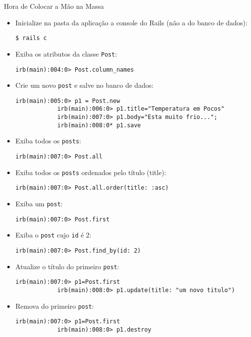 \begin{frame}{Hora de Colocar a Mão na Massa}
	\begin{itemize}
		\item Inicialize \alert{na pasta da aplicação} a console do Rails (não a do banco de dados):
		\begin{lstlisting}[style=BashInputBasicStyle]
			$ rails c
		\end{lstlisting}
		
		\item Exiba os atributos da classe \verb|Post|:
		\begin{lstlisting}[style=BashInputBasicStyle]
			irb(main):004:0> Post.column_names
		\end{lstlisting}
		
		\item Crie um novo \verb|post| e salve no banco de dados:
		\begin{lstlisting}[style=BashInputBasicStyle]
			irb(main):005:0> p1 = Post.new
			irb(main):006:0> p1.title="Temperatura em Pocos"
			irb(main):007:0> p1.body="Esta muito frio...";
			irb(main):008:0* p1.save
		\end{lstlisting}
		
		\item Exiba todos os \verb|posts|:
		\begin{lstlisting}[style=BashInputBasicStyle]
			irb(main):007:0> Post.all
		\end{lstlisting}
		
		\item Exiba todos os \verb|posts| ordenados pelo título (title):
		\begin{lstlisting}[style=BashInputBasicStyle]
			irb(main):007:0> Post.all.order(title: :asc)
		\end{lstlisting}
		
		\item Exiba um \verb|post|:
		\begin{lstlisting}[style=BashInputBasicStyle]
			irb(main):007:0> Post.first
		\end{lstlisting}
		
		\item Exiba o \verb|post| cujo \verb|id| é 2:
		\begin{lstlisting}[style=BashInputBasicStyle]
			irb(main):007:0> Post.find_by(id: 2)
		\end{lstlisting}
		
		\item Atualize o título do primeiro \verb|post|:
		\begin{lstlisting}[style=BashInputBasicStyle]
			irb(main):007:0> p1=Post.first
			irb(main):008:0> p1.update(title: "um novo titulo")
		\end{lstlisting}
		
		\item Remova do primeiro \verb|post|:
		\begin{lstlisting}[style=BashInputBasicStyle]
			irb(main):007:0> p1=Post.first
			irb(main):008:0> p1.destroy
		\end{lstlisting}
		
	\end{itemize}
\end{frame}